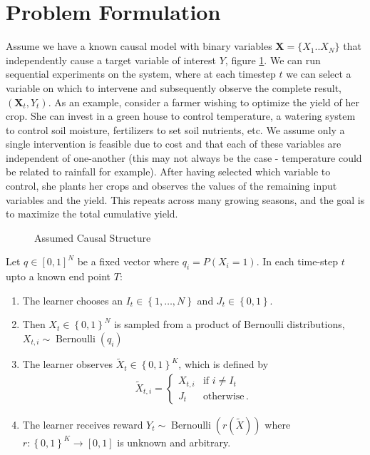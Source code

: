 \documentclass{article}
\newcommand{\set}[1]{\left\{#1\right\}}
\newcommand{\eq}[1]{\begin{align*}#1\end{align*}}
\newcommand{\Ber}{\operatorname{Bernoulli}}
\theoremstyle{plain}
\theoremstyle{definition}
\begin{document}
\section*{Problem Formulation}
Assume we have a known causal model with binary variables $\boldsymbol{X} = \{X_{1}..X_{N}\}$ that independently cause a target variable of interest $Y$, figure \ref{fig:causalStructure}. We can run sequential experiments on the system, where at each timestep $t$ we can select a variable on which to intervene and subsequently observe the complete result, $(\boldsymbol{X}_{t},Y_{t})$. As an example, consider a farmer wishing to optimize the yield of her crop. She can invest in a green house to control temperature, a watering system to control soil moisture, fertilizers to set soil nutrients, etc. We assume only a single intervention is feasible due to cost and that each of these variables are independent of one-another (this may not always be the case - temperature could be related to rainfall for example). After having selected which variable to control, she plants her crops and observes the values of the remaining input variables and the yield. This repeats across many growing seasons, and the goal is to maximize the total cumulative yield.

\begin{figure}[h]
\centering
\caption{Assumed Causal Structure}
\label{fig:causalStructure}
\end{figure}


Let $q \in [0,1]^N$ be a fixed vector where $q_i = P(X_i = 1)$. In each time-step $t$ upto a known end point $T$:
 
\begin{enumerate}
\item The learner chooses an $I_t \in \set{1,\ldots, N}$ and $J_t \in \set{0,1}$.
\item Then $X_t \in \set{0,1}^N$ is sampled from a product of Bernoulli distributions, $X_{t,i} \sim \Ber(q_i)$ 
\item The learner observes $\tilde X_t \in \set{0,1}^K$, which is defined by 
\eq{
\tilde X_{t,i} = \begin{cases}
X_{t,i} &\text{if } i \neq I_t \\
J_t & \text{otherwise}\,.
\end{cases}
}
\item The learner receives reward $Y_t \sim \Ber(r(\tilde X))$ where $r:\set{0,1}^K \to [0,1]$ is unknown and arbitrary.
\end{enumerate}
\end{document}
